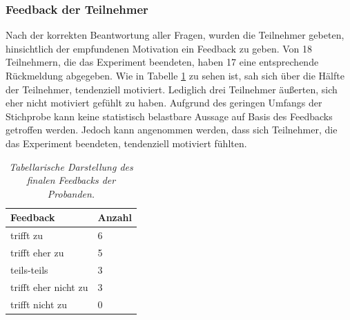 \subsubsection{Feedback der Teilnehmer}
Nach der korrekten Beantwortung aller Fragen, wurden die Teilnehmer gebeten, hinsichtlich der empfundenen Motivation ein Feedback zu geben. Von 18 Teilnehmern, die das Experiment beendeten, haben 17 eine entsprechende Rückmeldung abgegeben. Wie in Tabelle \ref{feedback} zu sehen ist, sah sich über die Hälfte der Teilnehmer, tendenziell motiviert. Lediglich drei Teilnehmer äußerten, sich eher nicht motiviert gefühlt zu haben. Aufgrund des geringen Umfangs der Stichprobe kann keine statistisch belastbare Aussage auf Basis des Feedbacks getroffen werden. Jedoch kann angenommen werden, dass sich Teilnehmer, die das Experiment beendeten, tendenziell motiviert fühlten.

\begin{table}[htbp]
\centering
\caption{\textit{Tabellarische Darstellung des finalen Feedbacks der Probanden.}}
\begin{tabular}{ p{4cm}   p{2cm}}
 \hline
 Feedback & Anzahl \\
 \hline
 trifft zu & 6 \\
 trifft eher zu & 5 \\
 teils-teils & 3 \\
 trifft eher nicht zu & 3 \\
 trifft nicht zu & 0 \\
 \hline
\end{tabular}
\label{feedback}
\end{table}